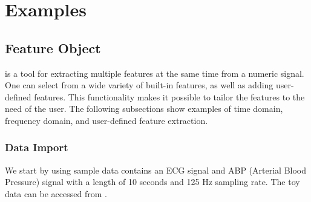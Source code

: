 \documentclass{article}
\begin{document}







\appendix
\section{Examples}\label{sec:appx}



\lstset{style=mystyle}

\subsection{Feature Object} \label{ssec:feature_obj}
 is a tool for extracting multiple features at the same time from a numeric signal. One can select from a wide variety of built-in features, as well as adding user-defined features. This functionality makes it possible to tailor the features to the need of the user.
The following subsections show examples of time domain, frequency domain, and user-defined feature extraction.

\subsubsection{Data Import}
We start by using sample data contains an ECG signal and ABP (Arterial Blood Pressure) signal with a length of 10 seconds and 125 Hz sampling rate. The toy data can be accessed from .
\end{document}
